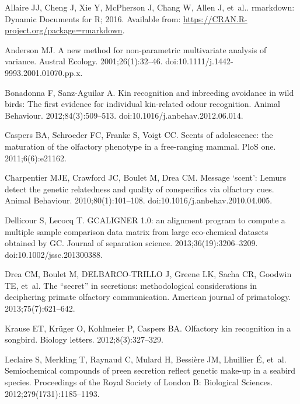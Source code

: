 \documentclass[10pt,letterpaper]{article}
\begin{document}
\begin{thebibliography}{10}

Allaire JJ, Cheng J, Xie Y, McPherson J, Chang W, Allen J, et~al.. rmarkdown:
  Dynamic Documents for R; 2016.
\newblock Available from: \url{https://CRAN.R-project.org/package=rmarkdown}.

Anderson MJ.
\newblock A new method for non-parametric multivariate analysis of variance.
\newblock Austral Ecology. 2001;26(1):32--46.
\newblock doi:{10.1111/j.1442-9993.2001.01070.pp.x}.

Bonadonna F, Sanz-Aguilar A.
\newblock Kin recognition and inbreeding avoidance in wild birds: The first
  evidence for individual kin-related odour recognition.
\newblock Animal Behaviour. 2012;84(3):509--513.
\newblock doi:{10.1016/j.anbehav.2012.06.014}.

Caspers BA, Schroeder FC, Franke S, Voigt CC.
\newblock Scents of adolescence: the maturation of the olfactory phenotype in a
  free-ranging mammal.
\newblock PloS one. 2011;6(6):e21162.

Charpentier MJE, Crawford JC, Boulet M, Drea CM.
\newblock Message `scent': Lemurs detect the genetic relatedness and quality of
  conspecifics via olfactory cues.
\newblock Animal Behaviour. 2010;80(1):101--108.
\newblock doi:{10.1016/j.anbehav.2010.04.005}.

Dellicour S, Lecocq T.
\newblock GCALIGNER 1.0: an alignment program to compute a multiple sample
  comparison data matrix from large eco-chemical datasets obtained by GC.
\newblock Journal of separation science. 2013;36(19):3206--3209.
\newblock doi:{10.1002/jssc.201300388}.

Drea CM, Boulet M, DELBARCO-TRILLO J, Greene LK, Sacha CR, Goodwin TE, et~al.
\newblock The “secret” in secretions: methodological considerations in
  deciphering primate olfactory communication.
\newblock American journal of primatology. 2013;75(7):621--642.

Krause ET, Kr{\"u}ger O, Kohlmeier P, Caspers BA.
\newblock Olfactory kin recognition in a songbird.
\newblock Biology letters. 2012;8(3):327--329.

Leclaire S, Merkling T, Raynaud C, Mulard H, Bessi{\`e}re JM, Lhuillier {\'E},
  et~al.
\newblock Semiochemical compounds of preen secretion reflect genetic make-up in
  a seabird species.
\newblock Proceedings of the Royal Society of London B: Biological Sciences.
  2012;279(1731):1185--1193.


\end{thebibliography}
\end{document}
